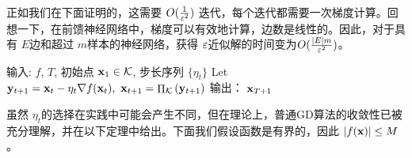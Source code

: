 正如我们在下面证明的，这需要 $O(\frac{1}{\varepsilon^2})$ 迭代，每个迭代都需要一次梯度计算。回想一下，在前馈神经网络中，梯度可以有效地计算，边数是线性的。因此，对于具有 $E$边和超过 $m$样本的神经网络，获得 $\varepsilon$近似解的时间变为$O( \frac{|E| m}{\varepsilon^2}) $。

\begin{algorithm}[h!]
\caption{ 
    梯度下降
    }
\label{alg:BasicGD}
\begin{algorithmic}[1]
\STATE %
输入: $f$, $T$, 初始点 $\mathbf x_1 \in \mathcal K$, 步长序列 $\{\eta_t\}$
\STATE Let $ \mathbf y_{t+1} = \mathbf x_{t}-\eta_t {\nabla f}(\mathbf x_t) , \  \mathbf x_{t+1}= \mathop{\Pi}_{\mathcal K} \left( \mathbf y_{t+1}  \right) $
\ENDFOR
\STATE 输出： ${\mathbf x}_{T+1} $ 
\end{algorithmic}
\end{algorithm}

虽然 $\eta_t$的选择在实践中可能会产生不同，但在理论上，普通GD算法的收敛性已被充分理解，并在以下定理中给出。下面我们假设函数是有界的，因此 $ |f(\mathbf x) | \leq M$。

